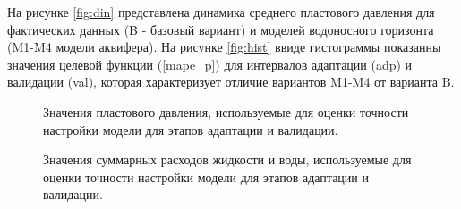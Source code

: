 \documentclass{article}
\begin{document}
На рисунке \ref{fig:din} представлена динамика среднего пластового давления для фактических данных (B - базовый вариант) и моделей водоносного горизонта (M1-M4 модели аквифера). На рисунке \ref{fig:hist} ввиде гистограммы показанны значения целевой функции (\ref{mape_p}) для интервалов адаптации (adp) и валидации (val), которая характеризует отличие вариантов M1-M4 от варианта B.
\begin{figure} 
    \begin{minipage}[h]{0.48\linewidth}
      \caption{Значения пластового давления, используемые для оценки точности настройки модели для этапов адаптации и валидации.}
      \label{fig:din}
    \end{minipage} \hfill
    \begin{minipage}[h]{0.48\linewidth}
      \caption{Значения суммарных расходов жидкости и воды, используемые для оценки точности настройки модели для этапов адаптации и валидации.}
      \label{fig:qlic}
    \end{minipage} 
\end{figure}
\end{document}
